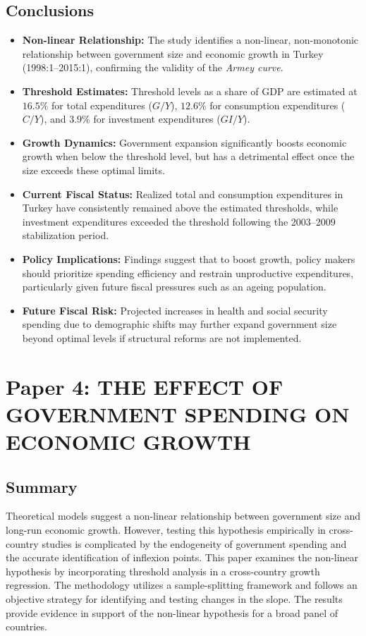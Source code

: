 \documentclass[10pt, oneside]{article}
\begin{document}
\subsection{Conclusions}
\begin{itemize}
	\item \textbf{Non-linear Relationship:} The study identifies a non-linear, non-monotonic relationship between government size and economic growth in Turkey (1998:1--2015:1), confirming the validity of the \textit{Armey curve}.
	\item \textbf{Threshold Estimates:} Threshold levels as a share of GDP are estimated at $16.5\%$ for total expenditures ($G/Y$), $12.6\%$ for consumption expenditures ($C/Y$), and $3.9\%$ for investment expenditures ($GI/Y$).
	\item \textbf{Growth Dynamics:} Government expansion significantly boosts economic growth when below the threshold level, but has a detrimental effect once the size exceeds these optimal limits.
	\item \textbf{Current Fiscal Status:} Realized total and consumption expenditures in Turkey have consistently remained above the estimated thresholds, while investment expenditures exceeded the threshold following the 2003--2009 stabilization period.
	\item \textbf{Policy Implications:} Findings suggest that to boost growth, policy makers should prioritize spending efficiency and restrain unproductive expenditures, particularly given future fiscal pressures such as an ageing population.
	\item \textbf{Future Fiscal Risk:} Projected increases in health and social security spending due to demographic shifts may further expand government size beyond optimal levels if structural reforms are not implemented.
\end{itemize}

\section{Paper 4: THE EFFECT OF GOVERNMENT SPENDING ON ECONOMIC GROWTH}

\subsection{Summary}
Theoretical models suggest a non-linear relationship between government size and long-run
economic growth. However, testing this hypothesis empirically in cross-country studies is
complicated by the endogeneity of government spending and the accurate identification of
inflexion points. This paper examines the non-linear hypothesis by incorporating threshold analysis
in a cross-country growth regression. The methodology utilizes a sample-splitting framework and
follows an objective strategy for identifying and testing changes in the slope. The results provide
evidence in support of the non-linear hypothesis for a broad panel of countries. \cite{christie2014effect}
\end{document}
